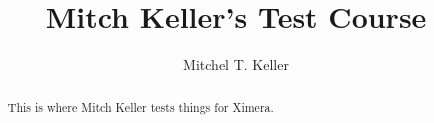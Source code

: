 \documentclass{xourse}
\title{Mitch Keller's Test Course}
\author{Mitchel T. Keller}
\begin{document}
  
\begin{abstract} %
This is where Mitch Keller tests things for Ximera.
\end{abstract}  
\maketitle  
 
 
\end{document}
